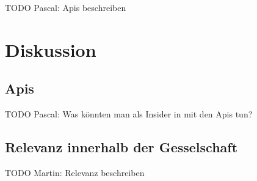 \documentclass[german]{cgspaper} %
\newcommand{\Martin}[1]{ \textcolor{colorMartin}{TODO Martin:} #1 }
\newcommand{\Pascal}[1]{ \textcolor{colorPascal}{TODO Pascal:} #1 }
\begin{document}
\Pascal{Apis beschreiben}

\section{Diskussion}

\subsection{Apis}

\Pascal{Was könnten man als Insider in mit den Apis tun?}

\subsection{Relevanz innerhalb der Gesselschaft}

\Martin{Relevanz beschreiben}





\end{document}

